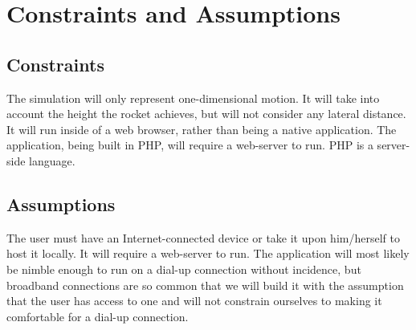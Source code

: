 \documentclass{report}
\begin{document}

	\section{Constraints and Assumptions}
		\subsection{Constraints}
			The simulation will only represent one-dimensional motion.  It will take into account the height the rocket achieves, but will not consider any lateral distance.  It will run inside of a web browser, rather than being a native application. The application, being built in PHP, will require a web-server to run. PHP is a server-side language.
		\subsection{Assumptions}
			The user must have an Internet-connected device or take it upon him/herself to host it locally.  It will require a web-server to run.  The application will most likely be nimble enough to run on a dial-up connection without incidence, but broadband connections are so common that we will build it with the assumption that the user has access to one and will not constrain ourselves to making it comfortable for a dial-up connection.
\end{document}
